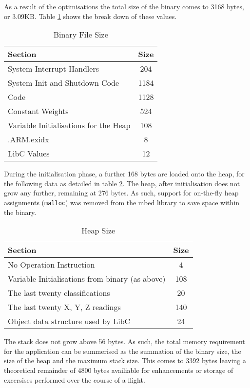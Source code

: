 As a result of the optimisations the total size of the binary comes to 3168 bytes, or 3.09KB. Table \ref{tab:prog-size} shows the break down of these values.

\begin{table}[h]
    \centering
    \begin{tabular}{|l|c|}
        \hline
        Section & Size \\
        \hline
        System Interrupt Handlers & 204 \\
        System Init and Shutdown Code & 1184 \\
        Code & 1128 \\
        Constant Weights & 524 \\
        Variable Initialisations for the Heap & 108 \\
        .ARM.exidx & 8 \\
        LibC Values & 12 \\
        \hline
    \end{tabular}
    \caption{Binary File Size \label{tab:prog-size}}
\end{table}

During the initialisation phase, a further 168 bytes are loaded onto the heap, for the following data as detailed in table \ref{tab:heap-size}. The heap, after initialisation does not grow any further, remaining at 276 bytes. As such, support for on-the-fly heap assignments (\verb|malloc|) was removed from the mbed library to save space within the binary.

\begin{table}[h]
    \centering
    \begin{tabular}{|l|c|}
        \hline
        Section & Size \\
        \hline
        No Operation Instruction & 4 \\
        Variable Initialisations from binary (as above) & 108 \\
        The last twenty classifications & 20 \\
        The last twenty X, Y, Z readings & 140 \\
        Object data structure used by LibC & 24 \\
        \hline
    \end{tabular}
    \caption{Heap Size \label{tab:heap-size}}
\end{table}

The stack does not grow above 56 bytes. As such, the total memory requirement for the application can be summerised as the summation of the binary size, the size of the heap and the maximum stack size. This comes to 3392 bytes leaving a theoretical remainder of 4800 bytes availiable for enhancements or storage of excersises performed over the course of a flight.
